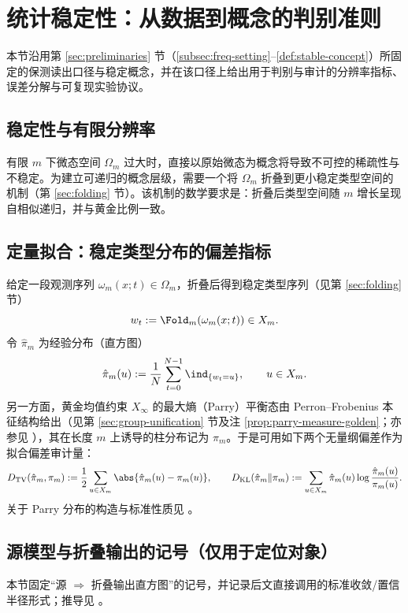 \section{统计稳定性：从数据到概念的判别准则}\label{sec:statistical-stability}

本节沿用第 \ref{sec:preliminaries} 节（\ref{subsec:freq-setting}--\ref{def:stable-concept}）所固定的保测读出口径与稳定概念，并在该口径上给出用于判别与审计的分辨率指标、误差分解与可复现实验协议。

\subsection{稳定性与有限分辨率}

有限 $m$ 下微态空间 $\Omega_m$ 过大时，直接以原始微态为概念将导致不可控的稀疏性与不稳定。为建立可递归的概念层级，需要一个将 $\Omega_m$ 折叠到更小稳定类型空间的机制（第 \ref{sec:folding} 节）。该机制的数学要求是：折叠后类型空间随 $m$ 增长呈现自相似递归，并与黄金比例一致。

\subsection{定量拟合：稳定类型分布的偏差指标}\label{sec:quant-fit}
给定一段观测序列 $\omega_m(x;t)\in\Omega_m$，折叠后得到稳定类型序列（见第 \ref{sec:folding} 节）
\[
w_t:=\Fold_m(\omega_m(x;t))\in X_m.
\]
令 $\hat{\pi}_m$ 为经验分布（直方图）
\[
\hat{\pi}_m(u):=\frac{1}{N}\sum_{t=0}^{N-1}\ind_{\{w_t=u\}},\qquad u\in X_m.
\]
另一方面，黄金均值约束 $X_\infty$ 的最大熵（Parry）平衡态由 Perron--Frobenius 本征结构给出（见第 \ref{sec:group-unification} 节及注 \ref{prop:parry-measure-golden}；亦参见 \cite{LindMarcus1995}），其在长度 $m$ 上诱导的柱分布记为 $\pi_m$。于是可用如下两个无量纲偏差作为拟合偏差审计量：
\[
D_{\mathrm{TV}}(\hat{\pi}_m,\pi_m):=\frac12\sum_{u\in X_m}\abs{\hat{\pi}_m(u)-\pi_m(u)},\qquad
D_{\mathrm{KL}}(\hat{\pi}_m\|\pi_m):=\sum_{u\in X_m}\hat{\pi}_m(u)\log\frac{\hat{\pi}_m(u)}{\pi_m(u)}.
\]
关于 Parry 分布的构造与标准性质见 \cite{LindMarcus1995}。

\subsection{源模型与折叠输出的记号（仅用于定位对象）}\label{subsec:histogram-convergence-natural-sources}
本节固定“源 $\Rightarrow$ 折叠输出直方图”的记号，并记录后文直接调用的标准收敛/置信半径形式；推导见 \cite{WaltersErgodicTheory,WeissmanEtAl2003L1Empirical}。

